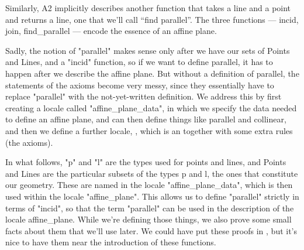 \begin{isabellebody}
\begin{isamarkuptext}
Similarly, A2 implicitly describes another function that takes a line and a point and returns a line,
 one that we'll call ``find parallel''. The three functions --- incid, join, find_parallel --- encode the 
essence of an affine plane. 

Sadly, the notion of "parallel" makes sense only after we have our sets of Points and Lines, and a "incid" function, 
so if we want to define parallel, it has to happen after we describe the affine plane. But without a definition of
parallel, the statements of the axioms become very messy, since they essentially have to replace "parallel" with 
the not-yet-written definition. We address this by first creating a locale called "affine_plane_data", in which 
we specify the data needed to define an affine plane, and can then define things like parallel and collinear, 
and then we define a further locale, , which is an  together with some
extra rules (the axioms).

In what follows, "p" and "l" are the types used for points and lines, and Points and Lines are the particular subsets 
of the types p and l, the ones that constitute our geometry. These are named in the locale "affine_plane_data", which is then 
used within the locale "affine_plane". This allows us to define "parallel" strictly in terms of "incid", so that the
term "parallel" can be used in the description of the locale affine_plane. While we're defining those 
things, we also prove some small facts about them that we'll use later. We could have put these proofs
in , but it's nice to have them near the introduction of these functions.


\end{isamarkuptext}
\end{isabellebody}
